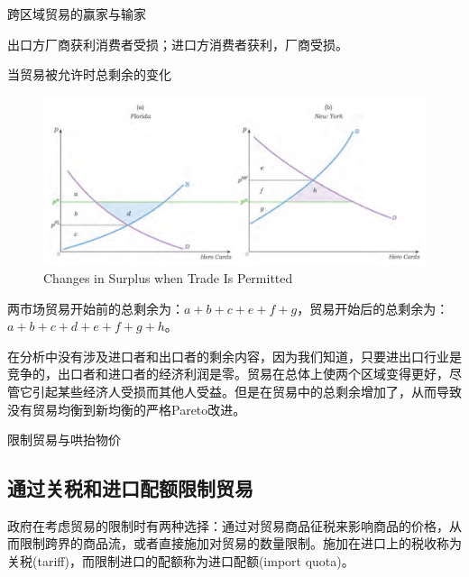 \documentclass{article}
\begin{document}
\hspace*{\fill}

跨区域贸易的赢家与输家

出口方厂商获利消费者受损；进口方消费者获利，厂商受损。

\hspace*{\fill}

当贸易被允许时总剩余的变化

\begin{figure}[H] %
	\centering %
	\includegraphics[width=1\textwidth]{20_2} %
	\caption{Changes in Surplus when Trade Is Permitted} %
	\label{Fig.main3} %
\end{figure}

两市场贸易开始前的总剩余为：$ a+b+c+e+f+g $，贸易开始后的总剩余为：$ a+b+c+d+e+f+g+h $。

在分析中没有涉及进口者和出口者的剩余内容，因为我们知道，只要进出口行业是竞争的，出口者和进口者的经济利润是零。贸易在总体上使两个区域变得更好，尽管它引起某些经济人受损而其他人受益。但是在贸易中的总剩余增加了，从而导致没有贸易均衡到新均衡的严格Pareto改进。

\hspace*{\fill}

限制贸易与哄抬物价

\subsection{通过关税和进口配额限制贸易}

政府在考虑贸易的限制时有两种选择：通过对贸易商品征税来影响商品的价格，从而限制跨界的商品流，或者直接施加对贸易的数量限制。施加在进口上的税收称为关税(tariff)，而限制进口的配额称为进口配额(import quota)。

\hspace*{\fill}
\end{document}
